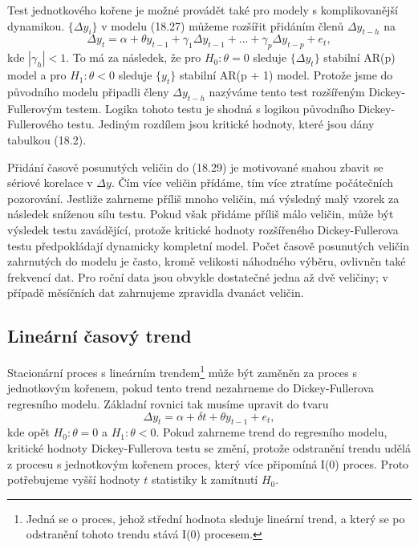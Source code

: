 Test jednotkového kořene je možné provádět také pro modely s komplikovanější dynamikou. $\{\Delta y_i\}$ 
v modelu (18.27) můžeme rozšířit přidáním členů $\Delta y_{t - h}$ na
\begin{equation}
\Delta y_t = \alpha + \theta y_{t-1} + \gamma_1 \Delta y_{t-1} + ... + \gamma_p \Delta y_{t - p} + e_t,
\end{equation}
kde $|\gamma_h| < 1$. To má za následek, že pro $H_0: \theta = 0$ sleduje $\{\Delta y_t\}$ stabilní AR(p) model a 
pro $H_1: \theta < 0$ sleduje $\{y_t\}$ stabilní AR(p + 1) model. 
Protože jsme do původního modelu připadli členy $\Delta y_{t - h}$ 
nazýváme tento test rozšířeným Dickey-Fullerovým testem. Logika 
tohoto testu je shodná s logikou původního Dickey-Fullerového 
testu. Jediným rozdílem jsou kritické hodnoty, které jsou dány 
tabulkou (18.2).

Přidání časově posunutých veličin do (18.29) je motivované snahou zbavit se sériové korelace v $\Delta y$. 
Čím více veličin přídáme, tím více ztratíme počátečních pozorování. Jestliže zahrneme příliš mnoho 
veličin, má výsledný malý vzorek za následek sníženou sílu testu. Pokud však přidáme příliš málo veličin, 
může být výsledek testu zavádějící, protože kritické hodnoty rozšířeného Dickey-Fullerova testu 
předpokládají dynamicky kompletní model. Počet časově posunutých veličin zahrnutých do modelu je často, 
kromě velikosti náhodného výběru, ovlivněn také frekvencí dat. Pro roční data jsou obvykle dostatečné jedna 
až dvě veličiny; v případě měsíčních dat zahrnujeme zpravidla dvanáct veličin.

\subsection{Lineární časový trend}

Stacionární proces s lineárním trendem\footnote{Jedná se o proces, jehož střední hodnota 
sleduje lineární trend, a který se po odstranění tohoto trendu 
stává I(0) procesem.} může být zaměněn za proces s jednotkovým 
kořenem, pokud tento trend nezahrneme do 
Dickey-Fullerova regresního modelu. Základní rovnici tak musíme upravit do tvaru
\begin{equation}
\Delta y_t = \alpha + \delta t + \theta y_{t - 1} + e_t,
\end{equation}
kde opět $H_0: \theta = 0$ a $H_1: \theta < 0$. Pokud zahrneme trend 
do regresního modelu, kritické hodnoty 
Dickey-Fullerova testu se změní, protože odstranění trendu udělá z procesu s jednotkovým kořenem proces, 
který více připomíná I(0) proces. Proto potřebujeme vyšší hodnoty $t$ statistiky k zamítnutí $H_0$.

